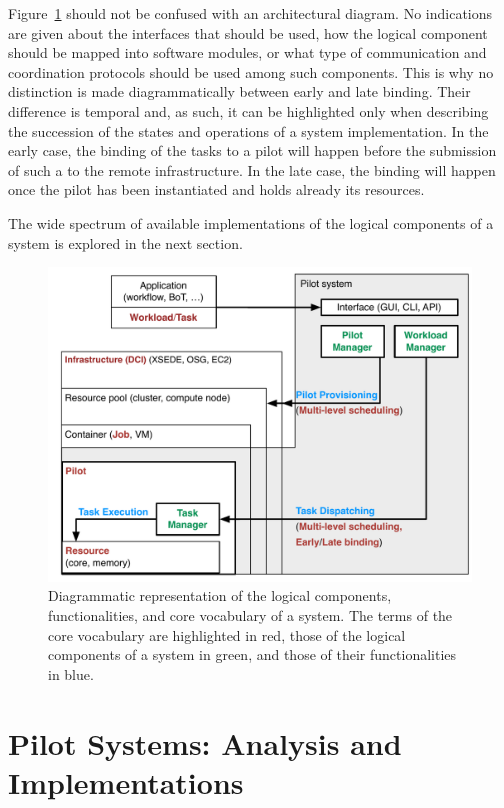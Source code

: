 \documentclass{sig-alternate}
\begin{document}
Figure~\ref{fig:core_vocabulary} should not be confused with an architectural
diagram. No indications are given about the interfaces that should be used, how
the logical component should be mapped into software modules, or what type of
communication and coordination protocols should be used among such components.
This is why no distinction is made diagrammatically between early and late
binding. Their difference is temporal and, as such, it can be highlighted only
when describing the succession of the states and operations of a \pilot system
implementation. In the early case, the binding of the tasks to a pilot will
happen before the submission of such a \pilot to the remote infrastructure. In
the late case, the binding will happen once the pilot has been instantiated and
holds already its resources.

The wide spectrum of available implementations of the logical components of a
\pilot system is explored in the next section.

\begin{figure}[t]
    \centering
        \includegraphics[width=.48\textwidth]{figures/core_vocabulary.pdf}
    \caption{Diagrammatic representation of the logical components,
    functionalities, and core vocabulary of a \pilot system. The terms of the
    core vocabulary are highlighted in red, those of the logical components of
    a \pilot system in green, and those of their functionalities in blue.}
    \label{fig:core_vocabulary}
\end{figure}


\section{Pilot Systems: Analysis and Implementations}
\label{sec:analysis}
\end{document}
